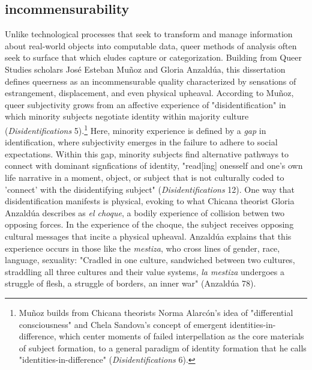 \documentclass[11pt]{article}
\begin{document}
\subsection{incommensurability}
\label{sec:org84c739e}
Unlike technological processes that seek to transform and manage
information about real-world objects into computable data, queer
methods of analysis often seek to surface that which eludes capture or
categorization. Building from Queer Studies scholars José Esteban
Muñoz and Gloria Anzaldúa, this dissertation defines queerness as an
incommensurable quality characterized by sensations of estrangement,
displacement, and even physical upheaval. According to Muñoz, queer
subjectivity grows from an affective experience of "disidentification"
in which minority subjects negotiate identity within majority culture
(\emph{Disidentifications} 5).\footnote{Muñoz builds from Chicana theorists Norma Alarcón's idea of
"differential consciousness" and Chela Sandova's concept of emergent
identities-in-difference, which center moments of failed
interpellation as the core materials of subject formation, to a
general paradigm of identity formation that he calls
"identities-in-difference" (\emph{Disidentifications} 6).} Here, minority experience is defined
by a \emph{gap} in identification, where subjectivity emerges in the
failure to adhere to social expectations. Within this gap, minority
subjects find alternative pathways to connect with dominant
signfications of identity, "read[ing] onesself and one's own life
narrative in a moment, object, or subject that is not culturally coded
to 'connect' with the disidentifying subject" (\emph{Disidentifications}
12). One way that disidentification manifests is physical, evoking to
what Chicana theorist Gloria Anzaldúa describes as \emph{el choque}, a
bodily experience of collision betwen two opposing forces. In the
experience of the choque, the subject receives opposing cultural
messages that incite a physical upheaval. Anzaldúa explains that this
experience occurs in those like the \emph{mestiza}, who cross lines of
gender, race, language, sexuality: "Cradled in one culture, sandwiched
between two cultures, straddling all three cultures and their value
systems, \emph{la mestiza} undergoes a struggle of flesh, a struggle of
borders, an inner war" (Anzaldúa 78).
\end{document}
